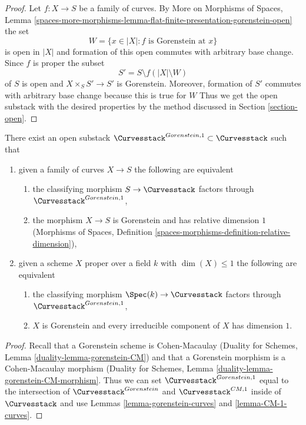 \begin{proof}
Let $f : X \to S$ be a family of curves. By
More on Morphisms of Spaces, Lemma
\ref{spaces-more-morphisms-lemma-flat-finite-presentation-gorenstein-open}
the set
$$
W = \{x \in |X| : f \text{ is Gorenstein at }x\}
$$
is open in $|X|$ and formation of this open commutes with arbitrary
base change. Since $f$ is proper the subset
$$
S' = S \setminus f(|X| \setminus W)
$$
of $S$ is open and $X \times_S S' \to S'$ is Gorenstein.
Moreover, formation of $S'$ commutes with arbitrary base
change because this is true for $W$
Thus we get the open substack with the desired properties
by the method discussed in Section \ref{section-open}.
\end{proof}

\begin{lemma}
\label{lemma-gorenstein-1-curves}
There exist an open substack
$\Curvesstack^{Gorenstein, 1} \subset \Curvesstack$ such that
\begin{enumerate}
\item given a family of curves $X \to S$ the following are equivalent
\begin{enumerate}
\item the classifying morphism $S \to \Curvesstack$ factors
through $\Curvesstack^{Gorenstein, 1}$,
\item the morphism $X \to S$ is Gorenstein and has
relative dimension $1$ (Morphisms of Spaces, Definition
\ref{spaces-morphisms-definition-relative-dimension}),
\end{enumerate}
\item given a scheme $X$ proper over a field $k$ with $\dim(X) \leq 1$
the following are equivalent
\begin{enumerate}
\item the classifying morphism $\Spec(k) \to \Curvesstack$ factors
through $\Curvesstack^{Gorenstein, 1}$,
\item $X$ is Gorenstein and every irreducible component of $X$
has dimension $1$.
\end{enumerate}
\end{enumerate}
\end{lemma}

\begin{proof}
Recall that a Gorenstein scheme is Cohen-Macaulay
(Duality for Schemes, Lemma \ref{duality-lemma-gorenstein-CM})
and that
a Gorenstein morphism is a Cohen-Macaulay morphism
(Duality for Schemes, Lemma \ref{duality-lemma-gorenstein-CM-morphism}.
Thus we can set
$\Curvesstack^{Gorenstein, 1}$ equal to the intersection
of $\Curvesstack^{Gorenstein}$ and $\Curvesstack^{CM, 1}$
inside of $\Curvesstack$ and use
Lemmas \ref{lemma-gorenstein-curves} and \ref{lemma-CM-1-curves}.
\end{proof}






